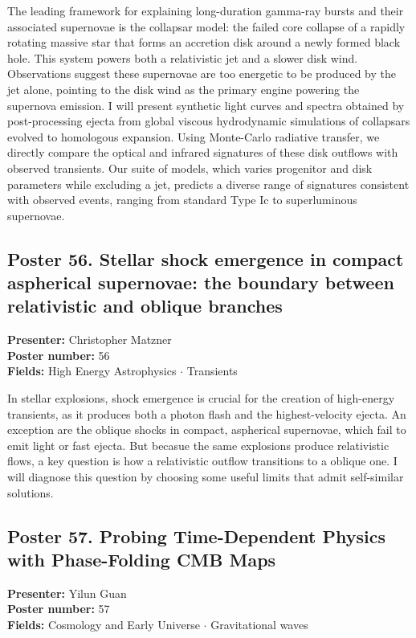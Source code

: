 The leading framework for explaining long-duration gamma-ray bursts and their associated supernovae is the collapsar model: the failed core collapse of a rapidly rotating massive star that forms an accretion disk around a newly formed black hole. This system powers both a relativistic jet and a slower disk wind. Observations suggest these supernovae are too energetic to be produced by the jet alone, pointing to the disk wind as the primary engine powering the supernova emission. I will present synthetic light curves and spectra obtained by post-processing ejecta from global viscous hydrodynamic simulations of collapsars evolved to homologous expansion. Using Monte-Carlo radiative transfer, we directly compare the optical and infrared signatures of these disk outflows with observed transients. Our suite of models, which varies progenitor and disk parameters while excluding a jet, predicts a diverse range of signatures consistent with observed events, ranging from standard Type Ic to superluminous supernovae.

\hypertarget{poster-abstract-talk-192}{}\label{poster-abstract-page-talk-192}
\subsection*{Poster 56. Stellar shock emergence in compact aspherical supernovae: the boundary between relativistic and oblique branches}
\textbf{Presenter:} Christopher Matzner\\
\textbf{Poster number:} 56\\
\textbf{Fields:} High Energy Astrophysics $\cdot$ Transients

In stellar explosions, shock emergence is crucial for the creation of high-energy transients, as it produces both a photon flash and the highest-velocity ejecta. An exception are the oblique shocks in compact, aspherical supernovae, which fail to emit light or fast ejecta. But becasue the same explosions produce relativistic flows, a key question is how a relativistic outflow transitions to a oblique one. I will diagnose this question by choosing some useful limits that admit self-similar solutions.

\hypertarget{poster-abstract-talk-44}{}\label{poster-abstract-page-talk-44}
\subsection*{Poster 57. Probing Time-Dependent Physics with Phase-Folding CMB Maps}
\textbf{Presenter:} Yilun Guan\\
\textbf{Poster number:} 57\\
\textbf{Fields:} Cosmology and Early Universe $\cdot$ Gravitational waves

